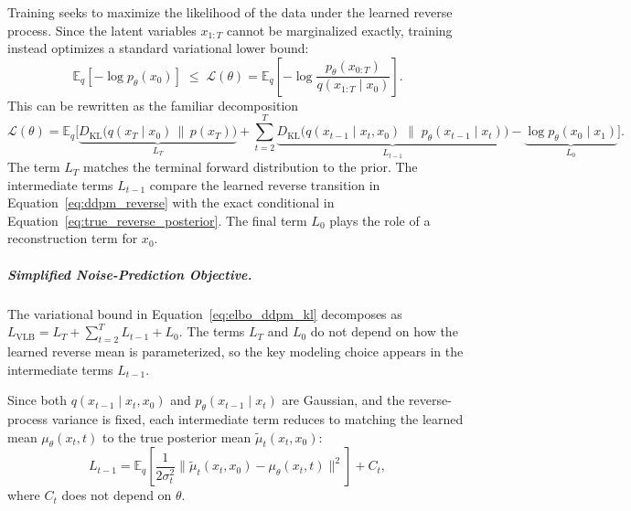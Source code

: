 Training seeks to maximize the likelihood of the data under the learned reverse process. 
Since the latent variables \(x_{1:T}\) cannot be marginalized exactly, training instead optimizes a standard variational lower bound:
\begin{equation}
    \mathbb{E}_q[-\log p_\theta(x_0)]
    \;\le\;
    \mathcal{L}(\theta)
    =
    \mathbb{E}_q\!\left[
        -\log\frac{p_\theta(x_{0:T})}{q(x_{1:T}\mid x_0)}
    \right].
    \label{eq:elbo_ddpm_raw}
\end{equation}
This can be rewritten as the familiar decomposition
\begin{equation}
    \mathcal{L}(\theta)
    =
    \mathbb{E}_q\Big[
        \underbrace{
            D_{\mathrm{KL}}\bigl(q(x_T\mid x_0)\,\|\,p(x_T)\bigr)
        }_{L_T}
        +
        \sum_{t=2}^{T}
        \underbrace{
            D_{\mathrm{KL}}\bigl(
                q(x_{t-1}\mid x_t,x_0)
                \;\|\;
                p_\theta(x_{t-1}\mid x_t)
            \bigr)
        }_{L_{t-1}}
        -
        \underbrace{\log p_\theta(x_0\mid x_1)}_{L_0}
    \Big].
    \label{eq:elbo_ddpm_kl}
\end{equation}
The term \(L_T\) matches the terminal forward distribution to the prior. The intermediate terms \(L_{t-1}\) compare the learned reverse transition in Equation~\ref{eq:ddpm_reverse} with the exact conditional in Equation~\ref{eq:true_reverse_posterior}. The final term \(L_0\) plays the role of a reconstruction term for \(x_0\).

\subparagraph{Simplified Noise-Prediction Objective.}

The variational bound in Equation~\ref{eq:elbo_ddpm_kl} decomposes as
\(
    L_{\mathrm{VLB}} = L_T + \sum_{t=2}^T L_{t-1} + L_0.
\)
The terms \(L_T\) and \(L_0\) do not depend on how the learned reverse mean is parameterized, so the key modeling choice appears in the intermediate terms \(L_{t-1}\).

Since both \(q(x_{t-1}\mid x_t,x_0)\) and \(p_\theta(x_{t-1}\mid x_t)\) are Gaussian, and the reverse-process variance is fixed, each intermediate term reduces to matching the learned mean \(\mu_\theta(x_t,t)\) to the true posterior mean \(\tilde{\mu}_t(x_t,x_0)\):
\begin{equation}
    L_{t-1}
    =
    \mathbb{E}_q\!\left[
        \frac{1}{2\sigma_t^2}
        \bigl\|
            \tilde{\mu}_t(x_t,x_0)
            -
            \mu_\theta(x_t,t)
        \bigr\|^2
    \right]
    + C_t,
    \label{eq:L_t_mse_form}
\end{equation}
where \(C_t\) does not depend on \(\theta\).

